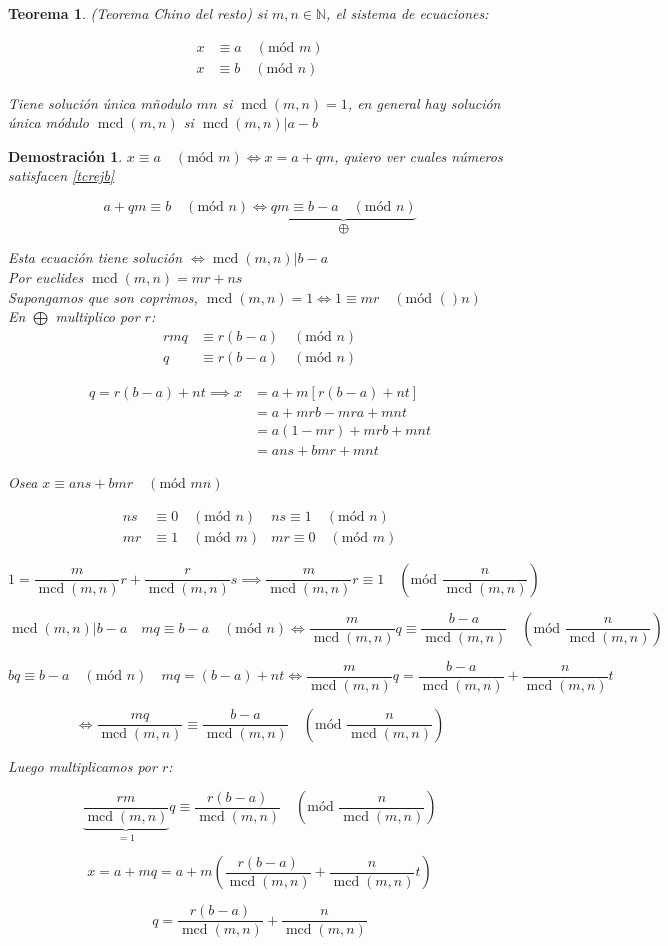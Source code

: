 \documentclass[9pt,a4paper,draft]{article}
\theoremstyle{definition}
\theoremstyle{plain}
\newtheorem{teo}{Teorema}
\newtheorem{demo}{Demostración}[teo]
\DeclareMathOperator{\mcd}{mcd}
\newcommand{\modu}[1]{\quad(\text{mód }#1)}
\begin{document}
\begin{teo} (Teorema Chino del resto) si $m,n\in{\mathbb{N}}$, el sistema de ecuaciones:

\begin{align}
\label{tcreja}x&\equiv a\modu{m}\\
\label{chrejb}x&\equiv b\modu{n}
\end{align}

Tiene solución única mñodulo $mn$ si $\mcd(m,n)=1$, en general hay solución única módulo $\mcd(m,n)$ si $\mcd(m,n)|a-b$
\end{teo} 

\begin{demo}
$x\equiv a\modu{m} \iff x=a+qm$, quiero ver cuales números satisfacen \ref{tcrejb}

$$a+qm\equiv b\modu{n} \iff \underbrace{qm\equiv b-a\modu{n}}_{\bigoplus}$$

Esta ecuación tiene solución $\iff \mcd(m,n)|b-a$ \\
Por euclides $\mcd(m,n)=mr+ns$ \\
Supongamos que son coprimos, $\mcd(m,n)=1\iff1\equiv mr\modu(n)$ \\
En $\bigoplus$ multiplico por $r$:
\begin{align*}
rmq &\equiv r(b-a)\modu{n} \\
q &\equiv r(b-a)\modu{n}
\end{align*}

\begin{align*}
q=r(b-a)+nt \implies x &= a+m[r(b-a)+nt]\\
                       &= a+mrb-mra+mnt\\
		       &= a(1-mr)+mrb+mnt\\
		       &= ans+bmr+mnt
\end{align*}

Osea $x\equiv ans + bmr \modu{mn}$

\begin{align*}
ns &\equiv 0\modu{n} & ns \equiv 1\modu{n}\\
mr &\equiv 1\modu{m} & mr \equiv 0\modu{m}
\end{align*}

$$ 1 = \frac{m}{\mcd(m,n)}r + \frac{r}{\mcd(m,n)}s \implies \frac{m}{\mcd(m,n)}r \equiv 1 \modu{\frac{n}{\mcd(m,n)}}$$

$$\mcd(m,n)|b-a \quad mq\equiv b-a\modu{n} \iff \frac{m}{\mcd(m,n)}q \equiv \frac{b-a}{\mcd(m,n)} \modu{\frac{n}{\mcd(m,n)}}$$

$$bq\equiv b-a\modu{n} \quad mq=(b-a)+nt \iff \frac{m}{\mcd(m,n)}q=\frac{b-a}{\mcd(m,n)} + \frac{n}{\mcd(m,n)}t$$

$$\iff \frac{mq}{\mcd(m,n)} \equiv \frac{b-a}{\mcd(m,n)} \modu{\frac{n}{\mcd(m,n)}}$$

Luego multiplicamos por $r$:

$$\underbrace{\frac{rm}{\mcd(m,n)}}_{=1}q \equiv \frac{r(b-a)}{\mcd(m,n)} \modu{\frac{n}{\mcd(m,n)}}$$

$$ x=a+mq = a+m(\frac{r(b-a)}{\mcd(m,n)} + \frac{n}{\mcd(m,n)}t)$$

$$q=\frac{r(b-a)}{\mcd(m,n)} + \frac{n}{\mcd(m,n)}$$

\end{demo}
\end{document}
